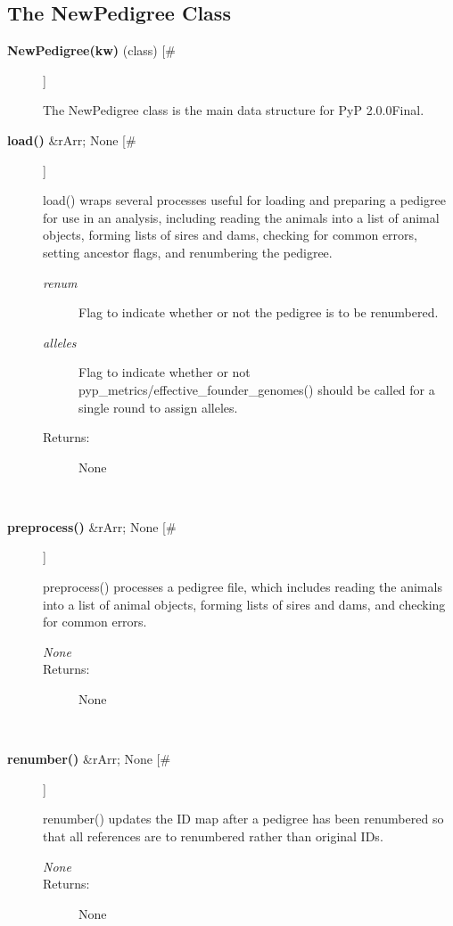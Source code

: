 \subsection*{The NewPedigree Class}
\begin{description}
\item[\textbf{NewPedigree(kw)}
 (class) [\#]]

 The NewPedigree class is the main data structure for PyP 2.0.0Final.

\item[\textbf{load()}
 \&rArr; None [\#]]

 load() wraps several processes useful for loading and preparing a pedigree for use in an analysis, including reading the animals into a list of animal objects, forming lists of sires and dams, checking for common errors, setting ancestor flags, and renumbering the pedigree.
\begin{description}
\item[\emph{renum}
] Flag to indicate whether or not the pedigree is to be renumbered.
\item[\emph{alleles}
] Flag to indicate whether or not pyp\_metrics/effective\_founder\_genomes() should be called for a single round to assign alleles.
\item[Returns:] None

\end{description}
\\ 

\item[\textbf{preprocess()}
 \&rArr; None [\#]]

 preprocess() processes a pedigree file, which includes reading the animals into a list of animal objects, forming lists of sires and dams, and checking for common errors.
\begin{description}
\item[\emph{None}
]
\item[Returns:] None

\end{description}
\\ 

\item[\textbf{renumber()}
 \&rArr; None [\#]]

 renumber() updates the ID map after a pedigree has been renumbered so that all references are to renumbered rather than original IDs.
\begin{description}
\item[\emph{None}
]
\item[Returns:] None


\end{description}
\end{description}
